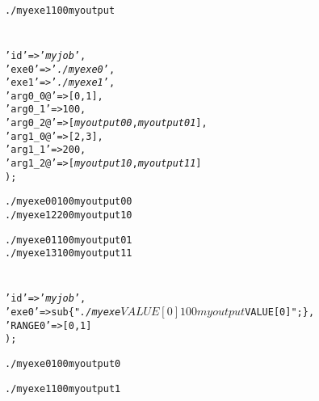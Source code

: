 \documentclass[a4paper,10pt]{report}
\begin{document}
\begin{boxnote}
\begin{alltt}
./myexe 1 100 myoutput
\end{alltt}
\end{boxnote}

\section{}

\begin{boxnote}
\begin{alltt}
%myjob = (
    'id' => '\textit{myjob}',
    'exe0' => '\textit{./myexe0}',
    'exe1' => '\textit{./myexe1}',
    'arg0_0@' => [0,1],
    'arg0_1' => 100,
    'arg0_2@' => [\textit{myoutput00},\textit{myoutput01}],
    'arg1_0@' => [2,3],
    'arg1_1' => 200,
    'arg1_2@' => [\textit{myoutput10},\textit{myoutput11}]
);
\end{alltt}
\end{boxnote}

\begin{boxnote}
\begin{alltt}
./myexe0 0 100 myoutput00
./myexe1 2 200 myoutput10
\end{alltt}
\end{boxnote}

\begin{boxnote}
\begin{alltt}
./myexe0 1 100 myoutput01
./myexe1 3 100 myoutput11
\end{alltt}
\end{boxnote}


\section{}

\begin{boxnote}
\begin{alltt}
%myjob = (
  'id' => '\textit{myjob}',
  'exe0' => sub \{ "\textit{./myexe} $VALUE[0] 100 \textit{myoutput} $VALUE[0]"; \},
  'RANGE0' => [0,1]
);
\end{alltt}
\end{boxnote}

\begin{boxnote}
\begin{alltt}
./myexe 0 100 myoutput0
\end{alltt}
\end{boxnote}

\begin{boxnote}
\begin{alltt}
./myexe 1 100 myoutput1
\end{alltt}
\end{boxnote}
\end{document}
